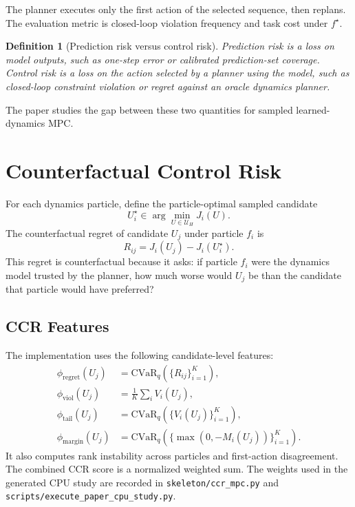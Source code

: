 \documentclass[11pt]{article}
\newtheorem{definition}{Definition}
\begin{document}
The planner executes only the first action of the selected sequence, then replans. The evaluation metric is closed-loop violation frequency and task cost under $f^\star$.

\begin{definition}[Prediction risk versus control risk]
Prediction risk is a loss on model outputs, such as one-step error or calibrated prediction-set coverage. Control risk is a loss on the action selected by a planner using the model, such as closed-loop constraint violation or regret against an oracle dynamics planner.
\end{definition}

The paper studies the gap between these two quantities for sampled learned-dynamics MPC.

\section{Counterfactual Control Risk}

For each dynamics particle, define the particle-optimal sampled candidate
\[
  U_i^\star \in \arg\min_{U\in\mathcal{U}_H} J_i(U).
\]
The counterfactual regret of candidate $U_j$ under particle $f_i$ is
\[
  R_{ij} = J_i(U_j) - J_i(U_i^\star).
\]
This regret is counterfactual because it asks: if particle $f_i$ were the dynamics model trusted by the planner, how much worse would $U_j$ be than the candidate that particle would have preferred?

\subsection{CCR Features}

The implementation uses the following candidate-level features:
\begin{align}
  \phi_{\mathrm{regret}}(U_j) &= \mathrm{CVaR}_q(\{R_{ij}\}_{i=1}^K),\\
  \phi_{\mathrm{viol}}(U_j) &= \frac{1}{K}\sum_i V_i(U_j),\\
  \phi_{\mathrm{tail}}(U_j) &= \mathrm{CVaR}_q(\{V_i(U_j)\}_{i=1}^K),\\
  \phi_{\mathrm{margin}}(U_j) &= \mathrm{CVaR}_q(\{\max(0,-M_i(U_j))\}_{i=1}^K).
\end{align}
It also computes rank instability across particles and first-action disagreement. The combined CCR score is a normalized weighted sum. The weights used in the generated CPU study are recorded in \texttt{skeleton/ccr\_mpc.py} and \texttt{scripts/execute\_paper\_cpu\_study.py}.
\end{document}
